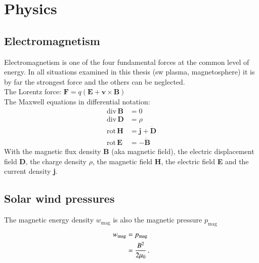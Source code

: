 
\chapter{Physics}
\label{chap:physics}

\section{Electromagnetism}	%

Electromagnetism is one of the four fundamental forces at the common level of energy. In all situations examined in this thesis (sw plasma, magnetosphere) it is by far the strongest force and the others can be neglected.\\

The Lorentz force: $\textbf{F} = q (\textbf{E} + \textbf{v} \times \textbf{B})$\\

The Maxwell equations in differential notation:
\begin{align}
	\text{div}\,\textbf{B} &= 0\\
	\text{div}\,\textbf{D} &= \rho\\
	\text{rot}\,\textbf{H} &= \textbf{j} + \dot{\textbf{D}}\\
	\text{rot}\,\textbf{E} &= - \dot{\textbf{B}}
\end{align}
With the magnetic flux density \textbf{B} (aka magnetic field), the electric displacement field \textbf{D}, the charge density $\rho$, the magnetic field \textbf{H}, the electric field \textbf{E} and the current density \textbf{j}.\\


\section{Solar wind pressures}

The magnetic energy density $w_\text{mag}$ is also the magnetic pressure $p_\text{mag}$
\begin{align}
	w_\text{mag} &= p_\text{mag}\\
	&= \frac{B^2}{2 \mu_0}	\text{\,.}
\end{align}

